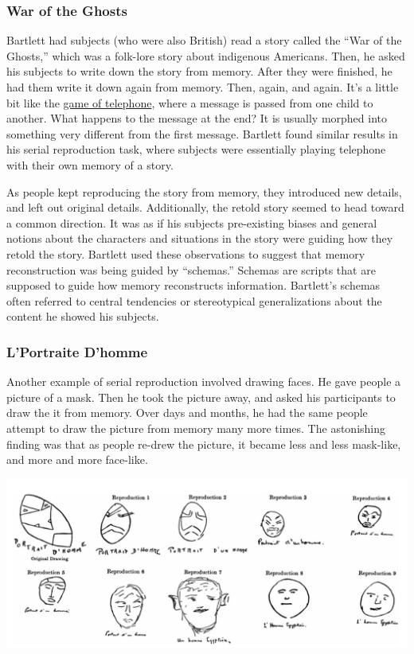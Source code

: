 \documentclass[
  oneside,
  12pt]{crumpbook}
\begin{document}
\hypertarget{war-of-the-ghosts}{%
\subsubsection{War of the Ghosts}\label{war-of-the-ghosts}}

Bartlett had subjects (who were also British) read a story called the ``War of the Ghosts,'' which was a folk-lore story about indigenous Americans. Then, he asked his subjects to write down the story from memory. After they were finished, he had them write it down again from memory. Then, again, and again. It's a little bit like the \href{https://en.wikipedia.org/wiki/Chinese_whispers}{game of telephone}, where a message is passed from one child to another. What happens to the message at the end? It is usually morphed into something very different from the first message. Bartlett found similar results in his serial reproduction task, where subjects were essentially playing telephone with their own memory of a story.

As people kept reproducing the story from memory, they introduced new details, and left out original details. Additionally, the retold story seemed to head toward a common direction. It was as if his subjects pre-existing biases and general notions about the characters and situations in the story were guiding how they retold the story. Bartlett used these observations to suggest that memory reconstruction was being guided by ``schemas.'' Schemas are scripts that are supposed to guide how memory reconstructs information. Bartlett's schemas often referred to central tendencies or stereotypical generalizations about the content he showed his subjects.

\hypertarget{lportraite-dhomme}{%
\subsubsection{L'Portraite D'homme}\label{lportraite-dhomme}}

Another example of serial reproduction involved drawing faces. He gave people a picture of a mask. Then he took the picture away, and asked his participants to draw the it from memory. Over days and months, he had the same people attempt to draw the picture from memory many more times. The astonishing finding was that as people re-drew the picture, it became less and less mask-like, and more and more face-like.

\begin{center}\includegraphics[width=1\linewidth]{imgs/Bartlett_homme} \end{center}
\end{document}
